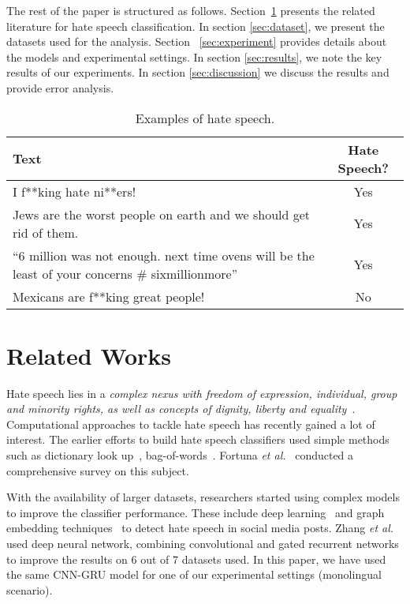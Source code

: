 \documentclass[runningheads]{llncs}
\begin{document}
The rest of the paper is structured as follows. Section~\ref{sec:relatedworks} presents the related literature for hate speech classification. In section \ref{sec:dataset}, we present the datasets used for the analysis. Section ~\ref{sec:experiment} provides details about the models and experimental settings. In section \ref{sec:results}, we note the key results of our experiments. In section \ref{sec:discussion} we discuss the results and provide error analysis.

\begin{table}[!tb]
\centering
\scriptsize
\caption{Examples of hate speech.}
\label{tab:examples}
\begin{tabular}{p{10cm} c}
Text                                                                              & Hate Speech? \\ \hline
I f**king hate ni**ers!                                                           & Yes          \\
Jews are the worst people on earth and we should get rid of them.                    & Yes          \\
“6 million was not enough. next time ovens will be the least of your concerns \# sixmillionmore” & Yes \\
Mexicans are f**king great people!                                                & No          
\end{tabular}

\end{table}

\section{Related Works}\label{sec:relatedworks}
Hate speech lies in a \textit{complex nexus with freedom of expression, individual, group and minority rights, as well as concepts of dignity, liberty and equality}~\cite{gagliardone2015countering}. Computational approaches to tackle hate speech has recently gained a lot of interest. The earlier efforts to build hate speech classifiers used simple methods such as dictionary look up~\cite{guermazi2007using}, bag-of-words~\cite{burnap2016us}.
 Fortuna \textit{et al.}~\cite{fortuna2018survey} conducted a comprehensive survey on this subject.

With the availability of larger datasets, researchers started using complex models to improve the classifier performance. These include deep learning~\cite{Badjatiya:2017:DLH:3041021.3054223,zhang2018detecting} and graph embedding techniques~\cite{ribeiro2018characterizing} to detect hate speech in social media posts. Zhang \textit{et al.}~\cite{zhang2018detecting} used deep neural network, combining convolutional and gated recurrent networks to improve the results on 6 out of 7 datasets used. In this paper, we have used the same CNN-GRU model for one of our experimental settings (monolingual scenario).
\end{document}
